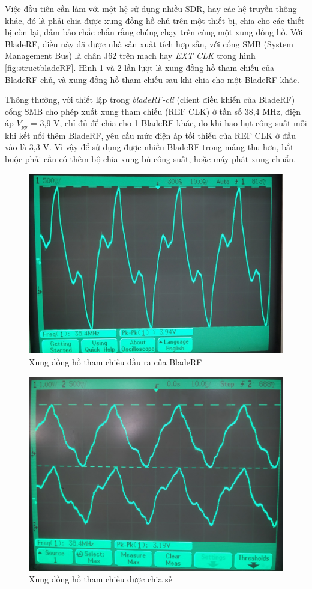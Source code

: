 Việc đầu tiên cần làm với một hệ sử dụng nhiều SDR, hay các hệ truyền thông khác, đó là phải chia được xung đồng hồ chủ trên một thiết bị, chia cho các thiết bị còn lại, đảm bảo chắc chắn rằng chúng chạy trên cùng một xung đồng hồ. Với BladeRF, điều này đã được nhà sản xuất tích hợp sẵn, với cổng SMB (System Management Bus) là chân J62 trên mạch hay \textit{EXT CLK} trong hình \ref{fig:structbladeRF}. Hình \ref{fig:clk} và \ref{fig:shareclk} lần lượt là xung đồng hồ tham chiếu của BladeRF chủ, và xung đồng hồ tham chiếu sau khi chia cho một BladeRF khác. 

Thông thường, với thiết lập trong \textit{bladeRF-cli} (client điều khiển của BladeRF) cổng SMB cho phép xuất xung tham chiếu (REF CLK) ở tần số 38,4 MHz, điện áp $V_{pp}$ = 3,9 V, chỉ đủ để chia cho 1 BladeRF khác, do khi hao hụt công suất mỗi khi kết nối thêm BladeRF, yêu cầu mức điện áp tối thiểu của REF CLK ở đầu vào là 3,3 V. Vì vậy để sử dụng được nhiều BladeRF trong mảng thu hơn, bắt buộc phải cần có thêm bộ chia xung bù công suất, hoặc máy phát xung chuẩn.

\begin{figure} [!h]
	\centering
	\includegraphics[width=0.8\linewidth]{figures/clk.jpg}
	\caption{Xung đồng hồ tham chiếu đầu ra của BladeRF}
	\label{fig:clk}
\end{figure}
\begin{figure} [!h]
	\centering
	\includegraphics[width=0.8\linewidth]{figures/shareclk.jpg}
	\caption{Xung đồng hồ tham chiếu được chia sẻ}
	\label{fig:shareclk}
\end{figure}

